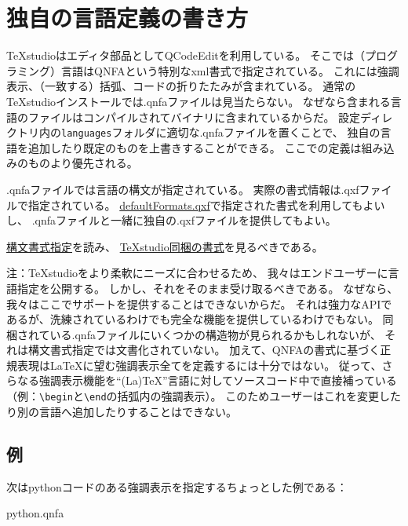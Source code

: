 \section{独自の言語定義の書き方}

TeXstudioはエディタ部品としてQCodeEditを利用している。
そこでは（プログラミング）言語はQNFAという特別なxml書式で指定されている。
これには強調表示、（一致する）括弧、コードの折りたたみが含まれている。
通常のTeXstudioインストールでは.qnfaファイルは見当たらない。
なぜなら含まれる言語のファイルはコンパイルされてバイナリに含まれているからだ。
設定ディレクトリ内の\verb+languages+フォルダに適切な.qnfaファイルを置くことで、
独自の言語を追加したり既定のものを上書きすることができる。
ここでの定義は組み込みのものより優先される。

.qnfaファイルでは言語の構文が指定されている。
実際の書式情報は.qxfファイルで指定されている。
\href{https://sourceforge.net/p/texstudio/hg/ci/default/tree/utilities/qxs/}{defaultFormats.qxf}で指定された書式を利用してもよいし、
.qnfaファイルと一緒に独自の.qxfファイルを提供してもよい。

\href{http://qcodeedit.edyuk.org/docs/qce\_examples.html}{構文書式指定}を読み、
\href{https://sourceforge.net/p/texstudio/hg/ci/default/tree/utilities/qxs/}{TeXstudio同梱の書式}を見るべきである。

注：TeXstudioをより柔軟にニーズに合わせるため、
我々はエンドユーザーに言語指定を公開する。
しかし、それをそのまま受け取るべきである。
なぜなら、我々はここでサポートを提供することはできないからだ。
それは強力なAPIであるが、洗練されているわけでも完全な機能を提供しているわけでもない。
同梱されている.qnfaファイルにいくつかの構造物が見られるかもしれないが、
それは構文書式指定では文書化されていない。
加えて、QNFAの書式に基づく正規表現はLaTeXに望む強調表示全てを定義するには十分ではない。
従って、さらなる強調表示機能を``(La)TeX''言語に対してソースコード中で直接補っている
（例：\verb+\begin+と\verb+\end+の括弧内の強調表示）。
このためユーザーはこれを変更したり別の言語へ追加したりすることはできない。

\subsection{例}

次はpythonコードのある強調表示を指定するちょっとした例である：

python.qnfa

